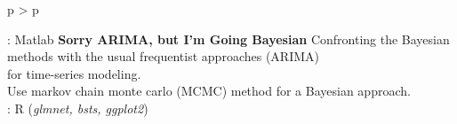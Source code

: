 \documentclass[cv]{cv_style}
\begin{document}
{\begin{tabular}{p{\leftsize\textwidth} > {\arraybackslash}p{\rightsize\textwidth}}
\begin{minipage}[t]{\rightsize\textwidth}
\begin{minipage}[t]{.94\textwidth}
{            }
            {
                \faGithub:   
            }
            {Matlab}
            \cvproject
            {\textbf{Sorry ARIMA, but I’m Going Bayesian}}
            {}
            {   
                Confronting the Bayesian methods with the usual frequentist approaches (ARIMA) \\
                for time-series modeling. \\
                \rightchevron\hspace{.1cm} Use markov chain monte carlo (MCMC) method for a Bayesian approach.\\
            }
            {
                \faGithub:  
            }
            {R (\textit{glmnet, bsts, ggplot2})}

        \end{minipage}



    \end{minipage}
\end{tabular}
}



%


     

\end{document}
